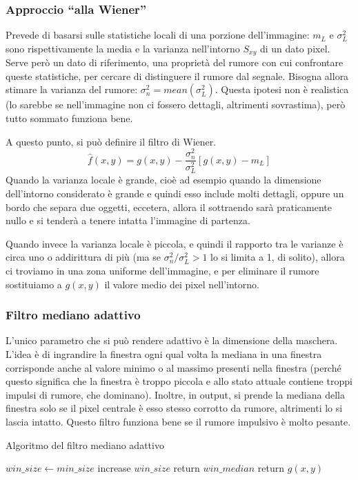 \documentclass[a4paper,11pt]{article}
\begin{document}
\subsubsection{Approccio ``alla Wiener''}
Prevede di basarsi sulle statistiche locali di una porzione dell'immagine: $m_L$ e $\sigma^2_L$ sono rispettivamente la media e la varianza nell'intorno $S_{xy}$ di un dato pixel.
Serve però un dato di riferimento, una proprietà del rumore con cui confrontare queste statistiche,
per cercare di distinguere il rumore dal segnale. Bisogna allora stimare la varianza del rumore: $\sigma^2_n = mean(\sigma^2_L)$. Questa ipotesi non è realistica
(lo sarebbe se nell'immagine non ci fossero dettagli, altrimenti sovrastima), però tutto sommato funziona bene.
\par
A questo punto, si può definire il filtro di Wiener.
\[
\hat{f}(x,y) = g(x,y) - \frac{\sigma^2_n}{\sigma^2_L}[g(x,y)-m_L]
\]
Quando la varianza locale è grande, cioè ad esempio quando la dimensione dell'intorno considerato è grande e quindi esso include molti dettagli, oppure un bordo che separa
due oggetti, eccetera, allora il sottraendo sarà praticamente nullo e si tenderà a tenere intatta l'immagine di partenza.
\par
Quando invece la varianza locale è piccola, e quindi il rapporto tra le varianze è circa uno o addirittura di più (ma se $\sigma^2_n / \sigma^2_L > 1$ lo si limita a 1, di solito),
allora ci troviamo in una zona uniforme dell'immagine, e per eliminare il rumore sostituiamo a $g(x,y)$ il valore medio dei pixel nell'intorno.

\subsubsection{Filtro mediano adattivo}
L'unico parametro che si può rendere adattivo è la dimensione della maschera. L'idea è di ingrandire la finestra ogni qual volta la mediana in una finestra corrisponde anche
al valore minimo o al massimo presenti nella finestra (perché questo significa che la finestra è troppo piccola e allo stato attuale contiene troppi impulsi di rumore, che dominano).
Inoltre, in output, si prende la mediana della finestra solo se il pixel centrale è esso stesso corrotto da rumore, altrimenti lo si lascia intatto.
Questo filtro funziona bene se il rumore impulsivo è molto pesante.
\begin{algorithm}
\caption{Algoritmo del filtro mediano adattivo}\label{alg:cap}
\begin{algorithmic}
\State $win\_size \gets min\_size$
    \State increase $win\_size$
\EndIf
\EndWhile
{}
    \State return $win\_median$
\Else
    \State return $g(x,y)$
\EndIf
\end{algorithmic}
\end{algorithm}
\end{document}
